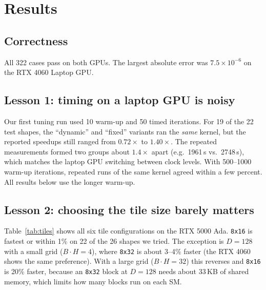 \documentclass[11pt]{article}
\begin{document}
\section{Results}

\subsection{Correctness}
All 322 cases pass on both GPUs. The largest absolute error was
$7.5 \times 10^{-6}$ on the RTX 4060 Laptop GPU.

\subsection{Lesson 1: timing on a laptop GPU is noisy}
Our first tuning run used 10 warm-up and 50 timed iterations. For 19 of
the 22 test shapes, the ``dynamic'' and ``fixed'' variants ran the
\emph{same} kernel, but the reported speedups still ranged from
$0.72\times$ to $1.40\times$. The repeated measurements formed two groups
about $1.4\times$ apart (e.g.\ 1961\,\textmu s vs.\ 2748\,\textmu s), which matches
the laptop GPU switching between clock levels. With 500--1000 warm-up
iterations, repeated runs of the same kernel agreed within a few percent.
All results below use the longer warm-up.

\subsection{Lesson 2: choosing the tile size barely matters}
Table~\ref{tab:tiles} shows all six tile configurations on the RTX 5000 Ada.
\texttt{8x16} is fastest or within 1\% on 22 of the 26 shapes we tried. The
exception is $D = 128$ with a small grid ($B \cdot H = 4$), where
\texttt{8x32} is about 3--4\% faster (the RTX 4060 shows the same preference).
With a large grid ($B \cdot H = 32$) this reverses and \texttt{8x16} is 20\%
faster, because an \texttt{8x32} block at $D = 128$ needs about 33\,KB of shared
memory, which limits how many blocks run on each SM.
\end{document}
